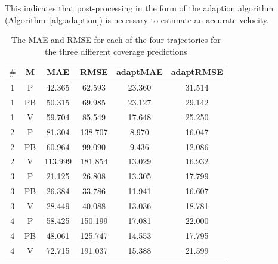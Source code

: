 This indicates that post-processing in the form of the adaption algorithm (Algorithm~\ref{alg:adaption}) is necessary to estimate an accurate velocity. 
	\begin{table}[h]
		\caption{The MAE and RMSE for each of the four trajectories for the three different coverage predictions}
		\begin{tabular}{|c|c|c|c|c|c|}
			\hline
			\textbf{$\#$} & \textbf{M} & \textbf{MAE} & \textbf{RMSE} & \textbf{adaptMAE} & \textbf{adaptRMSE} \\ \hline
			1             & P          & 42.365       & 62.593        & 23.360            & 31.514             \\  \hline %
			1             & PB         & 50.315       & 69.985        & 23.127            & 29.142             \\  \hline  %
			1             & V          & 59.704       & 85.549        & 17.648            & 25.250             \\  \hline%
			2             & P          & 81.304       & 138.707       & 8.970             & 16.047             \\ \hline %
			2             & PB         & 60.964       & 99.090        & 9.436             & 12.086             \\   \hline%
			2             & V          & 113.999      & 181.854       & 13.029            & 16.932             \\  \hline %
			3             & P          & 21.125       & 26.808        & 13.305            & 17.799             \\   \hline%
			3             & PB         & 26.384       & 33.786        & 11.941            & 16.607             \\   \hline%
			3             & V          & 28.449       & 40.088        & 13.036            & 18.781             \\  \hline%
			4             & P          & 58.425       & 150.199       & 17.081            & 22.000             \\  \hline%
			4             & PB         & 48.061       & 125.747       & 14.553            & 17.795             \\   \hline%
			4             & V          & 72.715       & 191.037       & 15.388            & 21.599             \\  \hline %
		\end{tabular}
		\label{table:results}
	\end{table}

